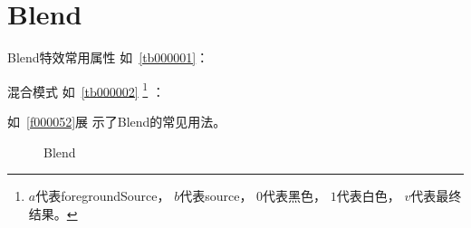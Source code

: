 ﻿




\FloatBarrier
\section{
Blend
}\label{c000015s000002}


Blend特效常用属性
如\tablename\ \ref{tb000001}：



混合模式
如\tablename\ \ref{tb000002}
    \footnote{$a$代表foregroundSource，
$b$代表source，
$0$代表黑色，
$1$代表白色，
$v$代表最终结果。}
：



如\filesourcenumbernameone\ \ref{f000052}展
示了Blend的常见用法。

\begin{figure}[htb] %
\marginnote{\setlength\fboxsep{2pt}\fbox{\footnotesize{\kaishu\figurename\,}\footnotesize{\ref{p000018}}}}\centering %
\setlength\fboxsep{0pt} %
\caption{Blend} %
\label{p000018} %
\end{figure}


